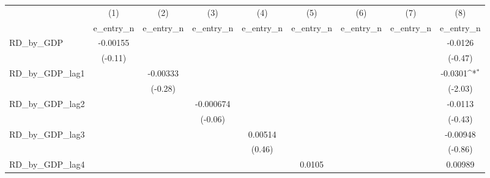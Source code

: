 {
\def\sym#1{\ifmmode^{#1}\else\(^{#1}\)\fi}
\begin{tabular}{l*{8}{c}}
\toprule
          &\multicolumn{1}{c}{(1)}&\multicolumn{1}{c}{(2)}&\multicolumn{1}{c}{(3)}&\multicolumn{1}{c}{(4)}&\multicolumn{1}{c}{(5)}&\multicolumn{1}{c}{(6)}&\multicolumn{1}{c}{(7)}&\multicolumn{1}{c}{(8)}\\
          &\multicolumn{1}{c}{e\_entry\_n}&\multicolumn{1}{c}{e\_entry\_n}&\multicolumn{1}{c}{e\_entry\_n}&\multicolumn{1}{c}{e\_entry\_n}&\multicolumn{1}{c}{e\_entry\_n}&\multicolumn{1}{c}{e\_entry\_n}&\multicolumn{1}{c}{e\_entry\_n}&\multicolumn{1}{c}{e\_entry\_n}\\
\midrule
RD\_by\_GDP & -0.00155         &                  &                  &                  &                  &                  &                  &  -0.0126         \\
          &  (-0.11)         &                  &                  &                  &                  &                  &                  &  (-0.47)         \\
\addlinespace
RD\_by\_GDP\_lag1&                  & -0.00333         &                  &                  &                  &                  &                  &  -0.0301\sym{*}  \\
          &                  &  (-0.28)         &                  &                  &                  &                  &                  &  (-2.03)         \\
\addlinespace
RD\_by\_GDP\_lag2&                  &                  &-0.000674         &                  &                  &                  &                  &  -0.0113         \\
          &                  &                  &  (-0.06)         &                  &                  &                  &                  &  (-0.43)         \\
\addlinespace
RD\_by\_GDP\_lag3&                  &                  &                  &  0.00514         &                  &                  &                  & -0.00948         \\
          &                  &                  &                  &   (0.46)         &                  &                  &                  &  (-0.86)         \\
\addlinespace
RD\_by\_GDP\_lag4&                  &                  &                  &                  &   0.0105         &                  &                  &  0.00989         \\

\end{tabular}}
